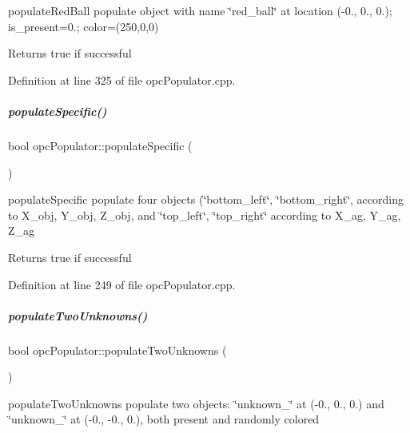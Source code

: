 populate\+Red\+Ball populate object with name \char`\"{}red\+\_\+ball\char`\"{} at location (-\/0., 0., 0.); is\+\_\+present=0.; color=(250,0,0) 

\begin{DoxyReturn}{Returns}
true if successful 
\end{DoxyReturn}


Definition at line 325 of file opc\+Populator.\+cpp.

\mbox{\label{group__opcPopulator_a0fba845edd63a15da94b864022d20ba3}} 
\subparagraph{\texorpdfstring{populate\+Specific()}{populateSpecific()}}
{\footnotesize\ttfamily bool opc\+Populator\+::populate\+Specific (\begin{DoxyParamCaption}{ }\end{DoxyParamCaption})}



populate\+Specific populate four objects (\char`\"{}bottom\+\_\+left\char`\"{}, \char`\"{}bottom\+\_\+right\char`\"{}, according to X\+\_\+obj, Y\+\_\+obj, Z\+\_\+obj, and \char`\"{}top\+\_\+left\char`\"{}, \char`\"{}top\+\_\+right\char`\"{} according to X\+\_\+ag, Y\+\_\+ag, Z\+\_\+ag 

\begin{DoxyReturn}{Returns}
true if successful 
\end{DoxyReturn}


Definition at line 249 of file opc\+Populator.\+cpp.

\mbox{\label{group__opcPopulator_a0f7311f7f70e2467ec283c7bae0a052c}} 
\subparagraph{\texorpdfstring{populate\+Two\+Unknowns()}{populateTwoUnknowns()}}
{\footnotesize\ttfamily bool opc\+Populator\+::populate\+Two\+Unknowns (\begin{DoxyParamCaption}{ }\end{DoxyParamCaption})}



populate\+Two\+Unknowns populate two objects\+: \char`\"{}unknown\+\_\char`\"{} at (-\/0., 0., 0.) and \char`\"{}unknown\+\_\char`\"{} at (-\/0., -\/0., 0.), both present and randomly colored 

